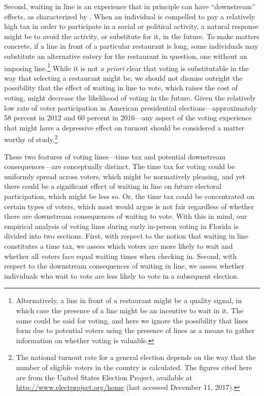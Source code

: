 \documentclass[12pt,titlepage]{article}
\begin{document}
Second, waiting in line is an experience that in principle can have
``downstream'' effects, as characterized by
\citet{pettigrew:longlinesminorityprecincts}. When an individual is
compelled to pay a relatively high tax in order to participate in a
social or political activity, a natural response might be to avoid the
activity, or substitute for it, in the future. To make matters
concrete, if a line in front of a particular restaurant is long, some
individuals may substitute an alternative eatery for the restaurant in
question, one without an imposing line.\footnote{Alternatively, a line
  in front of a restaurant might be a quality signal, in which case
  the presence of a line might be an incentive to wait in it.  The
  same could be said for voting, and here we ignore the possibility
  that lines form due to potential voters using the presence of lines
  as a means to gather information on whether voting is valuable.}
While it is not \emph{a priori} clear that voting is substitutable in
the way that selecting a restaurant might be, we should not dismiss
outright the possibility that the effect of waiting in line to vote,
which raises the cost of voting, might decrease the likelihood of
voting in the future.  Given the relatively low rate of voter
participation in American presidential elections---approximately 58
percent in 2012 and 60 percent in 2016---any aspect of the voting
experience that might have a depressive effect on turnout should be
considered a matter worthy of study.\footnote{The national turnout
  rate for a general election depends on the way that the number of
  eligible voters in the country is calculated.  The figures cited
  here are from the United States Election Project, available at
  \url{http://www.electproject.org/home} (last accessed December 11,
  2017).\label{fn:uselectionproject}}

These two features of voting lines---time tax and potential downstream
consequences---are conceptually distinct. The time tax for voting
could be uniformly spread across voters, which might be normatively
pleasing, and yet there could be a significant effect of waiting in
line on future electoral participation, which might be less so. Or,
the time tax could be concentrated on certain types of voters, which
most would argue is not fair regardless of whether there are
downstream consequences of waiting to vote. With this in mind, our
empirical analysis of voting lines during early in-person voting in
Florida is divided into two sections. First, with respect to the
notion that waiting in line constitutes a time tax, we assess which
voters are more likely to wait and whether all voters face equal
waiting times when checking in. Second, with respect to the downstream
consequences of waiting in line, we assess whether individuals who
wait to vote are less likely to vote in a subsequent election.
\end{document}
